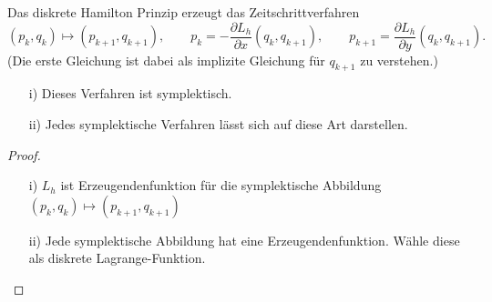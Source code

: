 \begin{satz}
Das diskrete Hamilton Prinzip erzeugt das Zeitschrittverfahren
\begin{equation*}
(p_k, q_k) \mapsto (p_{k+1}, q_{k+1}),
\qquad
p_k = - \frac{\partial L_h}{\partial x} (q_k, q_{k+1}),
\qquad
p_{k+1}  = \frac{\partial L_h}{\partial y} (q_k, q_{k+1}).
\end{equation*}
(Die erste Gleichung ist dabei als implizite Gleichung für $q_{k+1}$ zu verstehen.)
\begin{itemize}
\item[i)] Dieses Verfahren ist symplektisch.
\item[ii)] Jedes symplektische Verfahren lässt sich auf diese Art darstellen.
\end{itemize}
\end{satz}
\begin{proof}\mbox{} %
\begin{itemize}
  \item [i)] $L_h$ ist Erzeugendenfunktion für die symplektische Abbildung $(p_k, q_k) \mapsto (p_{k+1}, q_{k+1})$
  \item [ii)] Jede symplektische Abbildung hat eine Erzeugendenfunktion. Wähle diese als diskrete Lagrange-Funktion.
  \qedhere
\end{itemize}
\end{proof}

\bigskip

